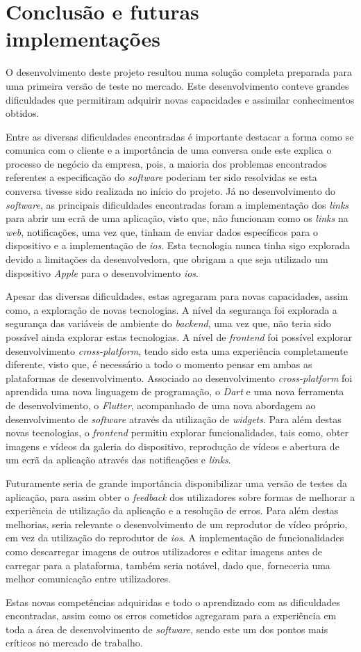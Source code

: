 \chapter{Conclusão e futuras implementações}

O desenvolvimento deste projeto resultou numa solução completa preparada para uma primeira versão de teste no mercado. Este desenvolvimento conteve grandes dificuldades que permitiram adquirir novas capacidades e assimilar conhecimentos obtidos.

Entre as diversas dificuldades encontradas é importante destacar a forma como se comunica com o cliente e a importância de uma conversa onde este explica o processo de negócio da empresa, pois, a maioria dos problemas encontrados referentes a especificação do \textit{software} poderiam ter sido resolvidas se esta conversa tivesse sido realizada no início do projeto. Já no desenvolvimento do \textit{software}, as principais dificuldades encontradas foram a implementação dos \textit{links} para abrir um ecrã de uma aplicação, visto que, não funcionam como os \textit{links} na \textit{web}, notificações, uma vez que, tinham de enviar dados específicos para o dispositivo e a implementação de \textit{ios}. Esta tecnologia nunca tinha sigo explorada devido a limitações da desenvolvedora, que obrigam a que seja utilizado um dispositivo \textit{Apple} para o desenvolvimento \textit{ios}.

Apesar das diversas dificuldades, estas agregaram para novas capacidades, assim como, a exploração de novas tecnologias. A nível da segurança foi explorada a segurança das variáveis de ambiente do \textit{backend}, uma vez que, não teria sido possível ainda explorar estas tecnologias. A nível de \textit{frontend} foi possível explorar desenvolvimento \textit{cross-platform}, tendo sido esta uma experiência completamente diferente, visto que, é necessário a todo o momento pensar em ambas as plataformas de desenvolvimento. Associado ao desenvolvimento \textit{cross-platform} foi aprendida uma nova linguagem de programação, o \textit{Dart} e uma nova ferramenta de desenvolvimento, o \textit{Flutter}, acompanhado de uma nova abordagem ao desenvolvimento de \textit{software} através da utilização de \textit{widgets}. Para além destas novas tecnologias, o \textit{frontend} permitiu explorar funcionalidades, tais como, obter imagens e vídeos da galeria do dispositivo, reprodução de vídeos e abertura de um ecrã da aplicação através das notificações e \textit{links}.

Futuramente seria de grande importância disponibilizar uma versão de testes da aplicação, para assim obter o \emph{feedback} dos utilizadores sobre formas de melhorar a experiência de utilização da aplicação e a resolução de erros. Para além destas melhorias, seria relevante o desenvolvimento de um reprodutor de vídeo próprio, em vez da utilização do reprodutor de \emph{ios}. A implementação de funcionalidades como descarregar imagens de outros utilizadores e editar imagens antes de carregar para a plataforma, também seria notável, dado que, forneceria uma melhor comunicação entre utilizadores. 

Estas novas competências adquiridas e todo o aprendizado com as dificuldades encontradas, assim como os erros cometidos agregaram para a experiência em toda a área de desenvolvimento de \emph{software}, sendo este um dos pontos mais críticos no mercado de trabalho.


